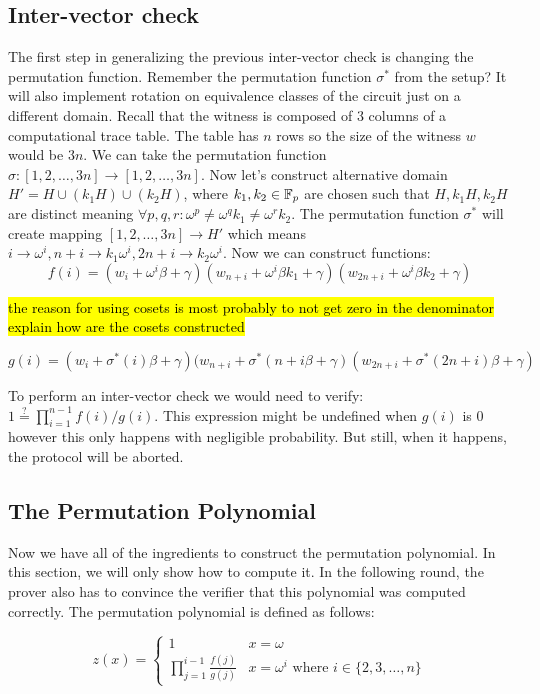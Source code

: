 \subsection{Inter-vector check}
The first step in generalizing the previous inter-vector check is changing the permutation function. Remember the permutation function $\sigma^*$ from the setup? It will also implement rotation on equivalence classes of the circuit just on a different domain. Recall that the witness is composed of 3 columns of a computational trace table. The table has $n$ rows so the size of the witness $w$ would be $3n$. We can take the permutation function $\sigma: [1, 2, \ldots, 3n] \rightarrow [1, 2, \ldots, 3n]$. Now let's construct alternative domain $H' = H \cup (k_1H) \cup (k_2H)$, where $k_1, k_2 \in \mathbb{F}_p$ are chosen such that $H, k_1H, k_2H$ are distinct meaning $\forall p, q, r: \omega^p \neq \omega^q k_1 \neq \omega^r k_2$. The permutation function $\sigma^*$ will create mapping $[1, 2, \ldots, 3n] \rightarrow H'$ which means $i \rightarrow \omega^i, n+i \rightarrow k_1 \omega^i, 2n+i \rightarrow k_2 \omega^i$. Now we can construct functions:
$$f(i) = (w_{i} + \omega^i\beta + \gamma)(w_{n+i} + \omega^i\beta k_1 + \gamma)(w_{2n+i} + \omega^i\beta k_2+ \gamma)$$

\hl{the reason for using cosets is most probably to not get zero in the denominator}
\hl{explain how are the cosets constructed}

$$g(i) = (w_{i} + \sigma^*(i)\beta + \gamma)(w_{n+i} + \sigma^*(n+i \beta + \gamma)(w_{2n+i} + \sigma^*(2n+i)\beta + \gamma)$$

To perform an inter-vector check we would need to verify: $1 \stackrel{?}{=} \prod_{i=1}^{n-1} f(i) / g(i)$. This expression might be undefined when $g(i)$ is 0 however this only happens with negligible probability. But still, when it happens, the protocol will be aborted.

\subsection{The Permutation Polynomial}
Now we have all of the ingredients to construct the permutation polynomial. In this section, we will only show how to compute it. In the following round, the prover also has to convince the verifier that this polynomial was computed correctly. The permutation polynomial is defined as follows:

\begin{definition}
    $$
    z(x) = 
    \begin{cases} 
          1 & x = \omega \\
          \prod_{j=1}^{i-1} \frac{f(j)}{g(j)} & x = \omega^i \text{ where } i \in \{2, 3, \ldots, n\}
    \end{cases}
    $$
\end{definition}

